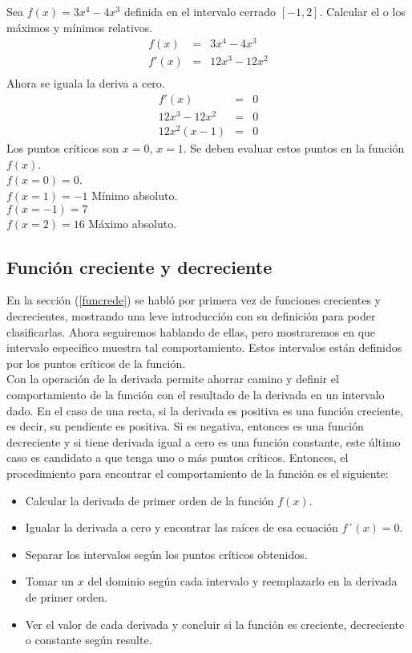 \begin{myexample}
Sea $f(x)=3x^{4}-4x^{3}$ definida en el intervalo cerrado $[-1,2]$. Calcular el o los máximos y mínimos relativos.
\begin{eqnarray*}
f(x)&=& 3x^{4}-4x^{3}\\
f'(x)&=& 12x^{3}-12x^{2}\\
\end{eqnarray*}
Ahora se iguala la deriva a cero.
\begin{eqnarray*}
f'(x)&=&0\\
12x^{3}-12x^{2}&=&0\\
12x^{2}(x-1)&=&0
\end{eqnarray*}
Los puntos críticos son $x=0$, $x=1$. Se deben evaluar estos puntos en la función $f(x)$.\\

\noindent $f(x=0)=0$.\\
\noindent $f(x=1)=-1$ Mínimo absoluto.\\
\noindent $f(x=-1)=7$\\
\noindent $f(x=2)=16$ Máximo absoluto.\\
\end{myexample}

\subsection{Función creciente y decreciente}
En la sección (\ref{funcrede}) se habló por primera vez de funciones crecientes y decrecientes, mostrando una leve introducción con su definición para poder clasificarlas. Ahora seguiremos hablando de ellas, pero mostraremos en que intervalo especifico muestra tal comportamiento. Estos intervalos están definidos por los puntos críticos de la función.\\
Con la operación de la derivada permite ahorrar camino y definir el comportamiento de la función con el resultado de la derivada en un intervalo dado. En el caso de una recta, si la derivada es positiva es una función creciente, es decir, su pendiente es positiva. Si es negativa, entonces es una función decreciente y si tiene derivada igual a cero es una función constante, este último caso es candidato a que tenga uno o más puntos críticos. Entonces, el procedimiento para encontrar el comportamiento de la función es el siguiente:

\begin{itemize}
	\item Calcular la derivada de primer orden de la función $f(x)$.
	\item Igualar la derivada a cero y encontrar las raíces de esa ecuación $f´(x)=0$.
	\item Separar los intervalos según los puntos críticos obtenidos.
	\item Tomar un $x$ del dominio según cada intervalo y reemplazarlo en la derivada de primer orden.
	\item Ver el valor de cada derivada y concluir si la función es creciente, decreciente o constante según resulte.
\end{itemize}

